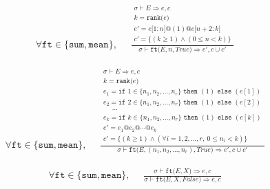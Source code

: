 \documentclass{article}
\makeatletter
\newcommand{\Rar}{\Rightarrow}
\newcommand{\mtt}[1]{\mathtt{#1}}
\newcommand{\bigspace}{\,\,\,\,\,\,\,\,}
\newcommand{\op}[2]{\mtt{#1(}#2\mtt{)}}
\newcommand{\conc}{\mtt{@}}
\newcommand{\indr}[2]{\mtt{[}#1\mtt{:}#2\mtt{]}}
\newcommand{\ifs}[3]{\mtt{if}\,\,#1\,\,\mtt{then}\,\,#2\,\,\mtt{else}\,\,#3}
\makeatother
\begin{document}
\begin{align*}
  \forall \mtt{ft} \in \{\mtt{sum}, \mtt{mean}\},
  \bigspace
  \frac
  {
    \begin{array}{l}
      \sigma \vdash E \Rar e, c \\
      k = \op{rank}{e} \\
      e' = e \indr{1}{n} \conc (1) \conc e \indr{n+2}{k} \\
      c' = \{ (k \geq 1) \land (0 \leq n < k) \}
    \end{array}
  }
  {
    \sigma \vdash \op{ft}{E, n, True} \Rar e', c \cup c'
  }
\end{align*}

\begin{align*}
  \forall \mtt{ft} \in \{\mtt{sum}, \mtt{mean}\},
  \bigspace
  \frac
  {
    \begin{array}{l}
      \sigma \vdash E \Rar e, c \\
      k = \op{rank}{e} \\
      e_1 = \ifs{1 \in \{n_1, n_2, \dots, n_r\}}{(1)}{(e[1])} \\
      e_2 = \ifs{2 \in \{n_1, n_2, \dots, n_r\}}{(1)}{(e[2])} \\
      \bigspace \cdots \\
      e_k = \ifs{k \in \{n_1, n_2, \dots, n_r\}}{(1)}{(e[k])} \\
      e' = e_1 \conc e_2 \conc \cdots \conc e_k \\
      c' = \{ (k \geq 1) \land (\forall i=1, 2, \dots, r,\: 0 \leq n_i < k) \}
    \end{array}
  }
  {
    \sigma \vdash \op{ft}{E, (n_1, n_2, \dots, n_r), True} \Rar e', c \cup c'
  }
\end{align*}

\begin{align*}
  \forall \mtt{ft} \in \{\mtt{sum}, \mtt{mean}\},
  \bigspace
  \frac
  {
    \sigma \vdash \op{ft}{E, X} \Rar e, c
  }
  {
    \sigma \vdash \op{ft}{E, X, False} \Rar e, c
  }
\end{align*}%
\end{document}
